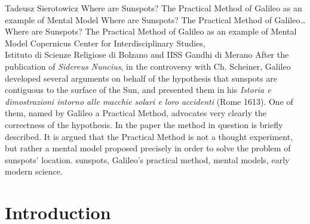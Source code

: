 \begin{artengenv}
	{Tadeusz Sierotowicz}
	{Where are Sunspots? The Practical Method of Galileo as an example of Mental Model}
	{Where are Sunspots? The Practical Method of Galileo\ldots}
	{Where are Sunspots? The Practical Method of Galileo as an example of Mental Model}
	{Copernicus Center for Interdisciplinary Studies,\\
		Istituto di Scienze Religiose di Bolzano and IISS Gandhi di Merano}
	{After the publication of \textit{Sidereus Nuncius}, in the controversy with Ch.
		Scheiner, Galileo developed several arguments on behalf of the hypothesis that sunspots are contiguous to the surface of the
		Sun, and presented them in his \textit{Istoria e dimostrazioni intorno alle macchie solari e loro accidenti}
		(Rome 1613).
		One of them, named by Galileo a Practical Method, advocates very clearly the correctness of the
		hypothesis. In the paper the method in question is briefly described. It is argued that the Practical Method is not a
		thought experiment, but rather a mental model proposed precisely in order to solve the problem of sunspots’ location. }
	{sunspots, Galileo’s practical method, mental models, early modern science.}




\section{Introduction}


\end{artengenv}
